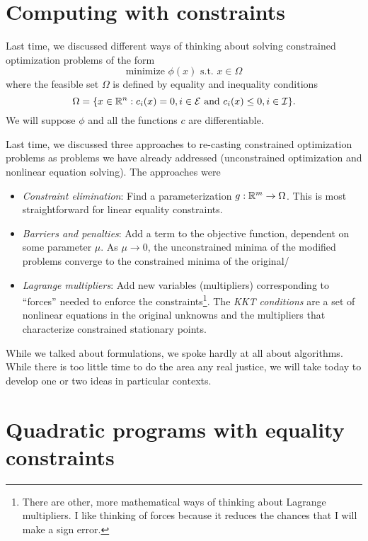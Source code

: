 \documentclass[12pt, leqno]{article} %
\begin{document}

\section*{Computing with constraints}

Last time, we discussed different ways of thinking about
solving constrained optimization problems of the form
\[
  \mbox{minimize } \phi(x) \mbox{ s.t.~} x \in \Omega
\]
where the feasible set $\Omega$ is defined by equality and inequality conditions
\[
\Omega = \{ x \in \mathbb{R}^n :
  c_i(x) = 0, i \in \mathcal{E} \mbox{ and }
  c_i(x) \leq 0, i \in \mathcal{I} \}.
\]
We will suppose $\phi$ and all the functions $c$ are differentiable.

Last time, we discussed three approaches to re-casting constrained
optimization problems as problems we have already addressed
(unconstrained optimization and nonlinear equation solving).
The approaches were
\begin{itemize}
\item
  {\em Constraint elimination}:
  Find a parameterization $g : \mathbb{R}^m \rightarrow \Omega$.
  This is most straightforward for linear equality constraints.
\item
  {\em Barriers and penalties}:
  Add a term to the objective function, dependent on some parameter
  $\mu$.  As $\mu \rightarrow 0$, the unconstrained minima of the
  modified problems converge to the constrained minima of the original/
\item
  {\em Lagrange multipliers}:
  Add new variables (multipliers) corresponding to ``forces'' needed
  to enforce the constraints\footnote{%
    There are other, more mathematical ways of thinking about Lagrange
    multipliers.  I like thinking of forces because it reduces the
    chances that I will make a sign error.
  }.
  The {\em KKT conditions} are a set of nonlinear equations in the
  original unknowns and the multipliers that characterize constrained
  stationary points.
\end{itemize}
While we talked about formulations, we spoke hardly at all about
algorithms.  While there is too little time to do the area any real
justice, we will take today to develop one or two ideas in
particular contexts.

\section*{Quadratic programs with equality constraints}
\end{document}
